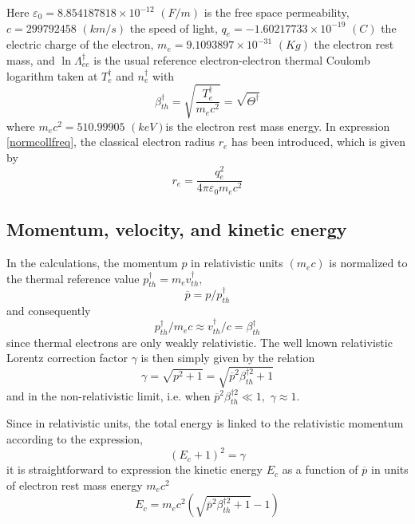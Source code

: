 Here $\varepsilon _{0}=8.854187818\times 10^{-12}$ $\left( F/m\right) $ is
the free space permeability, $c=299792458$ $\left( km/s\right) $ the speed
of light, $q_{e}=-1.60217733\times 10^{-19}$ $\left( C\right) $ the electric
charge of the electron, $m_{e}=9.1093897\times 10^{-31}$ $\left( Kg\right) $
the electron rest mass, and $\ln \Lambda _{ee}^{\dag }$ is the usual
reference electron-electron thermal Coulomb logarithm \cite{sau99} taken at $%
T_{e}^{\dag }$ and $n_{e}^{\dag }$ with 
\begin{equation}
\beta _{th}^{\dag }=\sqrt{\frac{T_{e}^{\dag }}{m_{e}c^{2}}}=\sqrt{\Theta
^{\dag }}
\end{equation}%
where $m_{e}c^{2}=510.99905$ $\left( keV\right) $is the electron rest mass
energy. In expression \ref{normcollfreq}, the classical electron radius $%
r_{e}$ has been introduced, which is given by 
\begin{equation}
r_{e}=\frac{q_{e}^{2}}{4\pi \varepsilon _{0}m_{e}c^{2}}
\end{equation}

\subsection{Momentum, velocity, and kinetic energy}

\label{momentnormdef}

\label{NormMomentum}In the calculations, the momentum $p$ in relativistic
units $\left( m_{e}c\right) $ is normalized to the thermal reference value $%
p_{th}^{\dag }=m_{e}v_{th}^{\dag },$%
\begin{equation}
\overline{p}=p/p_{th}^{\dag }
\end{equation}
and consequently 
\begin{equation}
p_{th}^{\dag }/m_{e}c\approx v_{th}^{\dag }/c=\beta _{th}^{\dag }
\end{equation}
since thermal electrons are only weakly relativistic. The well known
relativistic Lorentz correction factor $\gamma $ is then simply given by the
relation 
\begin{equation}
\gamma =\sqrt{p^{2}+1}=\sqrt{\overline{p}^{2}\beta _{th}^{\dag 2}+1}
\end{equation}
and in the non-relativistic limit, i.e. when $\overline{p}^{2}\beta
_{th}^{\dag 2}\ll 1,$ $\gamma \approx 1.$

Since in relativistic units, the total energy is linked to the relativistic
momentum according to the expression, 
\begin{equation}
\left( E_{c}+1\right) ^{2}=\gamma
\end{equation}
it is straightforward to expression the kinetic energy $E_{c}$ as a function
of $\overline{p}$ in units of electron rest mass energy $m_{e}c^{2}$%
\begin{equation}
E_{c}=m_{e}c^{2}\left( \sqrt{\overline{p}^{2}\beta _{th}^{\dag 2}+1}-1\right)
\end{equation}

